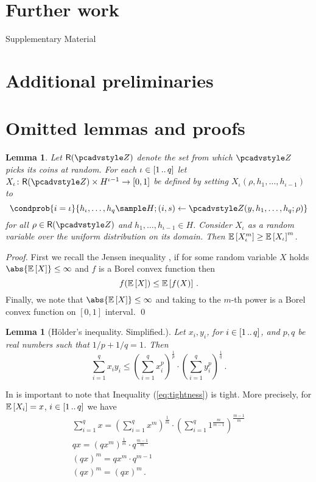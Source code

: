 \let\accentvec\vec \documentclass[runningheads,10pt]{llncs}
\newtheorem{lemma}[theorem]{Lemma}
\begin{document}
\section{Further work}



\clearpage
\appendix
{\Huge{Supplementary Material}}
\section{Additional preliminaries}

\section{Omitted lemmas and proofs}
\begin{lemma}\label{lem:jensen}
	Let $\RND{\zdv}$ denote the set from which $\zdv$ picks its coins at random.
	For each $\iota \in [1 \, .. \, q]$ let $X_\iota \colon \RND{\zdv} \times
	H^{\iota - 1} \to [0, 1]$ be defined by setting $X_\iota(\rho, h_1, \ldots,
h_{\iota - 1})$ to 
	\[
		\condprob{i = \iota}{h_\iota, \ldots, h_q \sample H; (i, s) \gets \zdv(y, h_1, \ldots, h_q; \rho)} 
	\] 
	for all $\rho \in \RND{\zdv}$ and $h_1, \ldots, h_{\iota - 1} \in H$. Consider $X_\iota$ as a random variable over the uniform distribution on its domain. 
	Then $\mathbb{E}\left[X_\iota^m\right] \geq \mathbb{E}\left[X_\iota\right]^m$.
\end{lemma}
\begin{proof}
	First we recall the Jensen inequality \cite{W:Weissten20}, if for some random variable $X$ holds $\abs{\expected{X}} \leq \infty$ and $f$ is a Borel convex function then 
	\[
		f(\mathbb{E}\left[X\right]) \leq \mathbb{E}\left[f(X)\right]\,.
	\] 
	Finally, we note that $\abs{\expected{X}} \leq \infty$ and taking to the $m$-th power is a Borel convex function on $[0, 1]$ interval. 
	\qed
\end{proof}

\begin{lemma}[H\"older's inequality. Simplified.]\label{lem:holder}
	Let $x_i, y_i$, for $i \in [1 \, .. \, q]$, and $p, q$ be real numbers such that $1/p + 1/q = 1$. Then
	\[
		\sum_{i = 1}^{q} x_i y_i \leq \left(\sum_{i = 1}^{q} x_i^p\right)^{\frac{1}{p}} \cdot \left(\sum_{i = 1}^{q} y_i^p\right)^{\frac{1}{q}}\,.
	\]
\end{lemma}

\begin{remark}
	In is important to note that Inequality (\ref{eq:tightness}) is tight. More precisely, for $\mathbb{E}\left[X_i\right] = x$, $i \in [1 \, .. \, q]$ we have
	\begin{gather*}
		\sum_{i = 1}^q x = \left(\sum_{i = 1}^{q} x^m\right)^\frac{1}{m} \cdot \left(\sum_{i = 1}^{q} 1^{\frac{m}{m - 1}}\right)^{\frac{m - 1}{m}} \\
		qx = \left(qx^m\right)^\frac{1}{m} \cdot q^{\frac{m - 1}{m}} \\
		(qx)^m = qx^m \cdot q^{m - 1} \\
		(qx)^m = (qx)^m\,.
	\end{gather*}
\end{remark}
\end{document}
